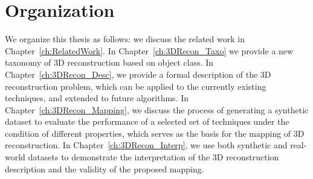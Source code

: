 \section{Organization}
We organize this thesis as follows: we discuss the related work in Chapter~\ref{ch:RelatedWork}. In Chapter~\ref{ch:3DRecon_Taxo} we provide a new taxonomy of 3D reconstruction based on object class. In Chapter~\ref{ch:3DRecon_Desc}, we provide a formal description of the 3D reconstruction problem, which can be applied to the currently existing techniques, and extended to future algorithms. In Chapter~\ref{ch:3DRecon_Mapping}, we discuss the process of generating a synthetic dataset to evaluate the performance of a selected set of techniques under the condition of different properties, which serves as the basis for the mapping of 3D reconstruction. In Chapter~\ref{ch:3DRecon_Interp}, we use both synthetic and real-world datasets to demonstrate the interpretation of the 3D reconstruction description and the validity of the proposed mapping.